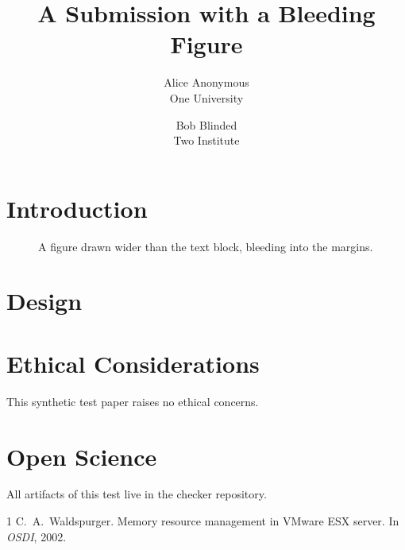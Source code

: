 \documentclass[letterpaper,twocolumn,10pt]{article}
\date{}
\title{\Large \bf A Submission with a Bleeding Figure}
\author{{\rm Alice Anonymous}\\One University \and {\rm Bob Blinded}\\Two Institute}
\begin{document}
\maketitle

\begin{abstract}
\lipsum[1][1-5]
\end{abstract}

\section{Introduction}
\lipsum[2-3]

\begin{figure}[t]
  \centering
  \makebox[0pt]{\rule{7.4in}{1.2in}}
  \caption{A figure drawn wider than the text block, bleeding into the margins.}
\end{figure}

\section{Design}
\lipsum[4-6]

\appendix
\section*{Ethical Considerations}
This synthetic test paper raises no ethical concerns.

\section*{Open Science}
All artifacts of this test live in the checker repository.

\begin{thebibliography}{1}
 C.~A.\ Waldspurger. Memory resource management in VMware ESX
  server. In \emph{OSDI}, 2002.
\end{thebibliography}
\end{document}

